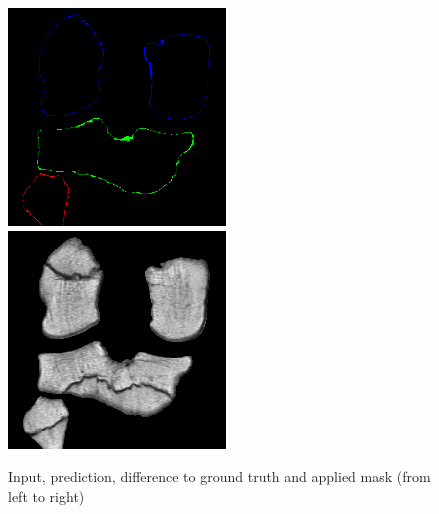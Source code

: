 \begin{figure}[H]
\endminipage\hfill
{}%
  \includegraphics[width=\linewidth]{imgs/c4.png}
\endminipage\hfill
{}%
  \includegraphics[width=\linewidth]{imgs/d4.png}
\endminipage
\caption{Input, prediction, difference to ground truth and applied mask (from left to right)}
\end{figure}

